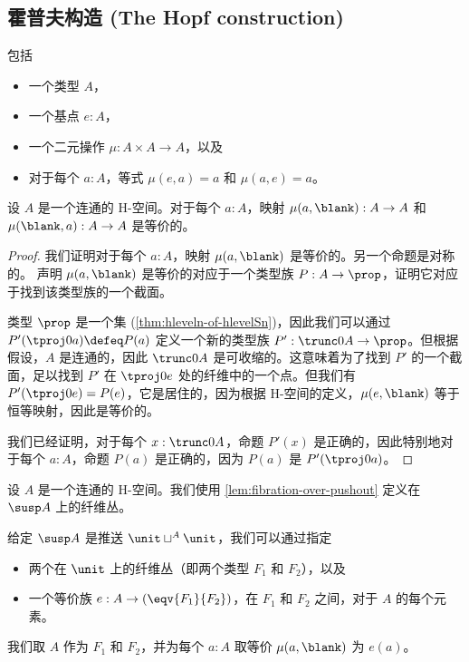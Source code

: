 {\subsection{霍普夫构造 (The Hopf construction)}

\begin{defn}
  包括
  \begin{itemize}
    \item 一个类型 $A$，
    \item 一个基点 $e:A$，
    \item 一个二元操作 $\mu:A\times A\to A$，以及
    \item 对于每个 $a:A$，等式 $\mu(e,a)=a$ 和 $\mu(a,e)=a$。
  \end{itemize}
\end{defn}

\begin{lem}
  设 $A$ 是一个连通的 H-空间。对于每个 $a:A$，映射 $\mu(a,\blank):A\to A$ 和 $\mu(\blank,a):A\to A$ 是等价的。
\end{lem}

\begin{proof}
  我们证明对于每个 $a:A$，映射 $\mu(a,\blank)$ 是等价的。另一个命题是对称的。
%
  声明 $\mu(a,\blank)$ 是等价的对应于一个类型族 $P:A\to\prop$，证明它对应于找到该类型族的一个截面。

  类型 $\prop$ 是一个集 (\cref{thm:hleveln-of-hlevelSn})，因此我们可以通过 $P'(\tproj0a)\defeq P(a)$ 定义一个新的类型族 $P':\trunc0A\to\prop$。但根据假设，$A$ 是连通的，因此 $\trunc0A$ 是可收缩的。这意味着为了找到 $P'$ 的一个截面，足以找到 $P'$ 在 $\tproj0e$ 处的纤维中的一个点。但我们有 $P'(\tproj0e)=P(e)$，它是居住的，因为根据 H-空间的定义，$\mu(e,\blank)$ 等于恒等映射，因此是等价的。

  我们已经证明，对于每个 $x:\trunc0A$，命题 $P'(x)$ 是正确的，因此特别地对于每个 $a:A$，命题 $P(a)$ 是正确的，因为 $P(a)$ 是 $P'(\tproj0a)$。
\end{proof}

\begin{defn}
  设 $A$ 是一个连通的 H-空间。我们使用 \cref{lem:fibration-over-pushout} 定义在 $\susp A$ 上的纤维丛。

  给定 $\susp A$ 是推送 $\unit\sqcup^A\unit$，我们可以通过指定
  \begin{itemize}
    \item 两个在 $\unit$ 上的纤维丛（即两个类型 $F_1$ 和 $F_2$），以及
    \item 一个等价族 $e:A\to(\eqv{F_1}{F_2})$，在 $F_1$ 和 $F_2$ 之间，对于 $A$ 的每个元素。
  \end{itemize}
%
  我们取 $A$ 作为 $F_1$ 和 $F_2$，并为每个 $a:A$ 取等价 $\mu(a,\blank)$ 为 $e(a)$。
\end{defn}

}
